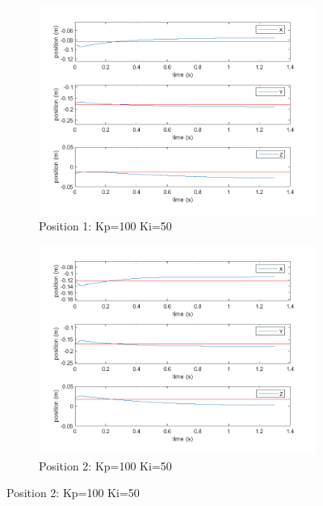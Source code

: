 \begin{figure}[ht]
    \begin{subfigure}[b]{0.45\textwidth}
        \includegraphics[width=\linewidth]{Pictures/Controller/Kp100Ki50/1.png}
        \caption{Position 1: Kp=100 Ki=50}
    \end{subfigure}%
    \hfill
    \begin{subfigure}[b]{0.45\textwidth}
        \includegraphics[width=\linewidth]{Pictures/Controller/Kp100Ki50/17.png}
        \caption{Position 2: Kp=100 Ki=50}
    \end{subfigure}

    \vspace{2pt} %


\end{figure}
